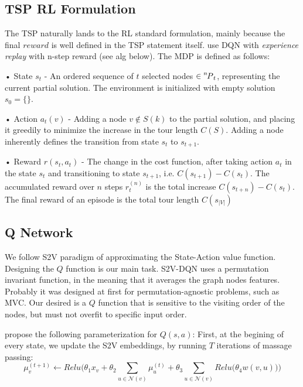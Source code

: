 \documentclass[10pt,a4paper,draft]{article}
\newcommand*\perm[2][^n]{\prescript{#1\mkern-2.5mu}{}P_{#2}}
\begin{document}
\subsection{TSP RL Formulation}	
The TSP naturally lands to the RL standard formulation, mainly because the final $reward$ is well defined in the TSP statement itself. 
\cite{dai17-tsp-s2v} use DQN with \textit{experience replay} with n-step reward (see alg below). The MDP is defined as follows:
\begin{list}{}{}
	\item[•] State $s_t$ - An ordered sequence of $t$ selected nodes $\in \perm[n]{t}$, representing the current partial solution. The environment is initialized with empty solution $s_0 = \{\}$.
	\item[•] Action $a_t(v)$ - Adding a node $v \not\in S(k)$ to the partial solution, and placing it greedily to minimize the increase in the tour length $C(S)$. Adding a node inherently defines the transition from state $s_t$ to $s_{t+1}$.
	\item[•] Reward $r(s_t,a_t)$ - The change in the cost function, after taking action $a_t$ in the state $s_t$ and transitioning to state $s_{t+1}$, i.e. $C(s_{t+1})-C(s_t)$. The accumulated reward over $n$ steps $r_t^{(n)}$ is the total increase $C(s_{t+n})-C(s_t)$. The final reward of an episode is the total tour length $C(s_{|V|})$
\end{list}


\subsection{Q Network}
We follow S2V paradigm of approximating the State-Action value function.
Designing the $Q$ function is our main task. S2V-DQN uses a permutation invariant function, in the meaning that it averages the graph nodes features. Probably it was designed at first for permutation-agnostic problems, such as MVC. Our desired is a $Q$ function that is sensitive to the visiting order of the nodes, but must not overfit to specific input order. 

\cite{dai17-tsp-s2v} propose the following parameterization for $Q(s,a)$:
First, at the begining of every state, we update the S2V embeddings, by running $T$ iterations of massage passing:
\begin{equation}
	\mu_v^{(t+1)} \leftarrow Relu\Bigg(\theta_1 x_v + \theta_2 \sum_{u \in \mathcal{N}(v)} \mu_u^{(t)} + \theta_3 \sum_{u \in \mathcal{N}(v)} Relu\big(\theta_4 w(v,u)\big)\Bigg)
		\label{s2v-dqn-nodes-features}
\end{equation}
\end{document}
